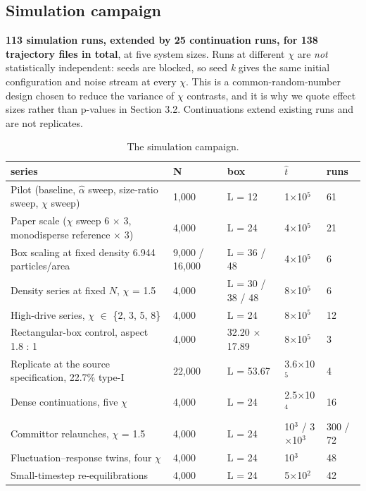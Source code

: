 \documentclass[aps,pre,preprint,superscriptaddress,nofootinbib,longbibliography]{revtex4-2}
\begin{document}
\subsection{Simulation campaign}

\textbf{113 simulation runs, extended by 25 continuation runs, for 138 trajectory files in total}, at five system sizes. Runs at different $\chi$ are \emph{not} statistically independent: seeds are blocked, so seed \emph{k} gives the same initial configuration and noise stream at every $\chi$. This is a common-random-number design chosen to reduce the variance of $\chi$ contrasts, and it is why we quote effect sizes rather than p-values in Section 3.2. Continuations extend existing runs and are not replicates.

\begin{table}[htbp]
\caption{The simulation campaign.}
\label{tab:1}
\begin{ruledtabular}
\begin{tabular}{p{4.61cm}p{2.00cm}p{2.39cm}p{2.83cm}p{1.51cm}}
\raggedright
series & N & box & $\hat{t}$ & runs \\
\hline
Pilot (baseline, $\hat{\alpha}$ sweep, size-ratio sweep, $\chi$ sweep) & 1,000 & L = 12 & 1$\times$10$^{5}$ & 61 \\
Paper scale ($\chi$ sweep 6 $\times$ 3, monodisperse reference $\times$ 3) & 4,000 & L = 24 & 4$\times$10$^{5}$ & 21 \\
Box scaling at fixed density 6.944 particles/area & 9,000 / 16,000 & L = 36 / 48 & 4$\times$10$^{5}$ & 6 \\
Density series at fixed $N$, $\chi$ = 1.5 & 4,000 & L = 30 / 38 / 48 & 8$\times$10$^{5}$ & 6 \\
High-drive series, $\chi$ $\in$ \{2, 3, 5, 8\} & 4,000 & L = 24 & 8$\times$10$^{5}$ & 12 \\
Rectangular-box control, aspect 1.8 : 1 & 4,000 & 32.20 $\times$ 17.89 & 8$\times$10$^{5}$ & 3 \\
Replicate at the source specification, 22.7\% type-I & 22,000 & L = 53.67 & 3.6$\times$10$^{5}$ & 4 \\
Dense continuations, five $\chi$ & 4,000 & L = 24 & 2.5$\times$10$^{4}$ & 16 \\
Committor relaunches, $\chi$ = 1.5 & 4,000 & L = 24 & 10$^{3}$ / 3$\times$10$^{3}$ & 300 / 72 \\
Fluctuation--response twins, four $\chi$ & 4,000 & L = 24 & 10$^{3}$ & 48 \\
Small-timestep re-equilibrations & 4,000 & L = 24 & 5$\times$10$^{2}$ & 42 \\
\end{tabular}
\end{ruledtabular}
\end{table}
\end{document}
